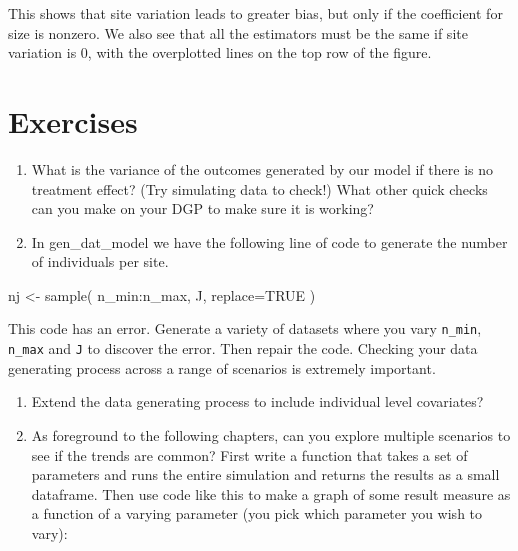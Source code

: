 \documentclass[
]{book}
\newenvironment{Shaded}{\begin{snugshade}}{\end{snugshade}}
\newcommand{\AttributeTok}[1]{\textcolor[rgb]{0.77,0.63,0.00}{#1}}
\newcommand{\ConstantTok}[1]{\textcolor[rgb]{0.00,0.00,0.00}{#1}}
\newcommand{\FunctionTok}[1]{\textcolor[rgb]{0.00,0.00,0.00}{#1}}
\newcommand{\NormalTok}[1]{#1}
\newcommand{\OtherTok}[1]{\textcolor[rgb]{0.56,0.35,0.01}{#1}}
\newcommand{\SpecialCharTok}[1]{\textcolor[rgb]{0.00,0.00,0.00}{#1}}
\begin{document}
This shows that site variation leads to greater bias, but only if the coefficient for size is nonzero.
We also see that all the estimators must be the same if site variation is 0, with the overplotted lines on the top row of the figure.

\hypertarget{exercises-2}{%
\section{Exercises}\label{exercises-2}}

\begin{enumerate}
\def\labelenumi{\arabic{enumi}.}
\item
  What is the variance of the outcomes generated by our model if there is no treatment effect? (Try simulating data to check!) What other quick checks can you make on your DGP to make sure it is working?
\item
  In gen\_dat\_model we have the following line of code to generate the number of individuals per site.
\end{enumerate}

\begin{Shaded}
\begin{Highlighting}[]
\NormalTok{nj }\OtherTok{\textless{}{-}} \FunctionTok{sample}\NormalTok{( n\_min}\SpecialCharTok{:}\NormalTok{n\_max, J, }
                 \AttributeTok{replace=}\ConstantTok{TRUE}\NormalTok{ )}
\end{Highlighting}
\end{Shaded}

This code has an error. Generate a variety of datasets where you vary \texttt{n\_min}, \texttt{n\_max} and \texttt{J} to discover the error. Then repair the code.
Checking your data generating process across a range of scenarios is extremely important.

\begin{enumerate}
\def\labelenumi{\arabic{enumi}.}
\setcounter{enumi}{1}
\item
  Extend the data generating process to include individual level covariates?
\item
  As foreground to the following chapters, can you explore multiple scenarios to see if the trends are common? First write a function that takes a set of parameters and runs the entire simulation and returns the results as a small dataframe.
  Then use code like this to make a graph of some result measure as a function of a varying parameter (you pick which parameter you wish to vary):
\end{enumerate}
\end{document}
